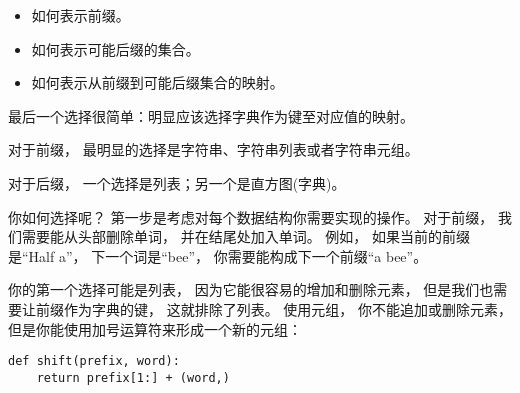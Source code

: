 \begin{itemize}
\item 如何表示前缀。
\item 如何表示可能后缀的集合。
\item 如何表示从前缀到可能后缀集合的映射。
\end{itemize}


最后一个选择很简单：明显应该选择字典作为键至对应值的映射。


对于前缀， 最明显的选择是字符串、字符串列表或者字符串元组。


对于后缀， 一个选择是列表；另一个是直方图(字典)。



你如何选择呢？ 第一步是考虑对每个数据结构你需要实现的操作。
对于前缀， 我们需要能从头部删除单词， 并在结尾处加入单词。
例如， 如果当前的前缀是``Half a''， 下一个词是``bee''，
你需要能构成下一个前缀``a bee''。


你的第一个选择可能是列表， 因为它能很容易的增加和删除元素，
但是我们也需要让前缀作为字典的键， 这就排除了列表。
使用元组， 你不能追加或删除元素，
但是你能使用加号运算符来形成一个新的元组：

\begin{lstlisting}
def shift(prefix, word):
    return prefix[1:] + (word,)
\end{lstlisting}

